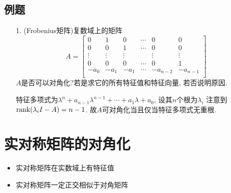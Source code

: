 \subsection*{例题}
\begin{itemize}
	\item[1.] (Frobenius矩阵)复数域上的矩阵
	\begin{equation}
	\nonumber
	A = \begin{bmatrix}
		0& 1& 0& \cdots& 0& 0\\
		0& 0& 1& \cdots& 0& 0\\
		\vdots& \vdots& \vdots& & \vdots& \vdots\\
		0& 0& 0& \cdots& 0& 1\\
	   -a_0& -a_1& -a_1& \cdots& -a_{n-2}& -a_{n-1}\\
	\end{bmatrix}
	\end{equation}
	$A$是否可以对角化?若是求它的所有特征值和特征向量, 若否说明原因.
	\begin{solution}
		特征多项式为$\lambda^{n} + a_{n-1}\lambda^{n-1} +\cdots + a_1 \lambda +a_0$, 设其$n$个根为$\lambda_i$
		注意到$\mathrm{rank}(\lambda_i I - A) = n-1$. 故$A$可对角化当且仅当特征多项式无重根.
	\end{solution}
	\vspace{2cm}
\end{itemize}

\section{实对称矩阵的对角化}
\begin{itemize}
\item 实对称矩阵在实数域上有特征值
\item 实对称矩阵一定正交相似于对角矩阵
\end{itemize}

